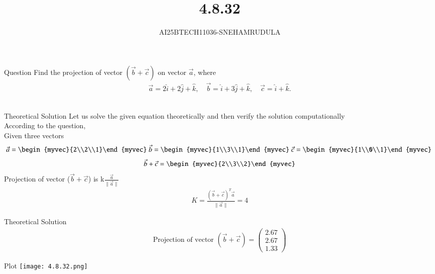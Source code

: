 \documentclass{beamer}
\title %
{4.8.32}
\author %
{AI25BTECH11036-SNEHAMRUDULA}
\begin{document}
\frame{\titlepage}
\begin{frame}{Question}
 Find the projection of vector $(\vec{b}+\vec{c})$ on vector $\vec{a}$, where 
\begin{align}
\vec{a} = 2\hat{i} + 2\hat{j} + \hat{k}, \quad 
\vec{b} = \hat{i} + 3\hat{j} + \hat{k}, \quad 
\vec{c} = \hat{i} + \hat{k}.
\end{align}\\ 
\end{frame}
\begin{frame}{Theoretical Solution}
Let us solve the given equation theoretically and then verify the solution computationally \\
According to the question, \\
Given three vectors\\
\begin{align}
\vec{a}=\begin{myvec}{2\\2\\1}\end{myvec}\
\vec{b}=\begin{myvec}{1\\3\\1}\end{myvec}\
\vec{c}=\begin{myvec}{1\\0\\1}\end{myvec}\
\end{align}
   \begin{align}
 \vec{b}+\vec{c}=\begin{myvec}{2\\3\\2}\end{myvec}
\end{align}
Projection of vector ($\vec{b}+\vec{c}$) is k$\frac{\vec{a}}{\|\vec{a}\|}$
\begin{align}
    K=\frac{(\vec{b}+\vec{c})^T\vec{a}}{\|\vec{a}\|}=4
\end{align}
\end{frame}
\begin{frame}{Theoretical Solution}
\begin{align}
\text{Projection of vector } (\vec{b}+\vec{c}) = 
\begin{pmatrix}
2.67 \\
2.67 \\
1.33
\end{pmatrix}
\end{align}
\end{frame}

\begin{frame}{Plot}
    \centering
    \texttt{[image: 4.8.32.png]}     
\end{frame}
\end{document}
